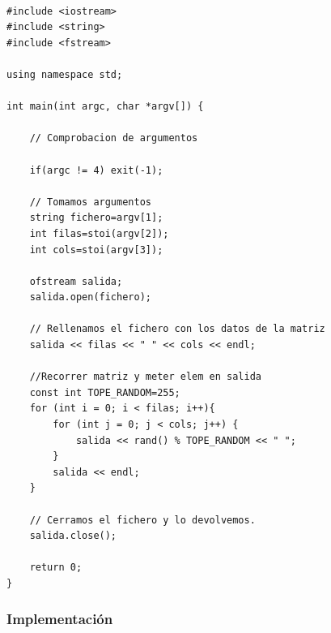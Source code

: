 \documentclass[a4paper,12pt,twoside]{article} %
\begin{document}
\lstset{language=C++}
\begin{lstlisting}

#include <iostream>
#include <string>
#include <fstream>

using namespace std;

int main(int argc, char *argv[]) {

    // Comprobacion de argumentos

    if(argc != 4) exit(-1);

    // Tomamos argumentos
    string fichero=argv[1];
    int filas=stoi(argv[2]);
    int cols=stoi(argv[3]);

    ofstream salida;
    salida.open(fichero);

    // Rellenamos el fichero con los datos de la matriz
    salida << filas << " " << cols << endl;

    //Recorrer matriz y meter elem en salida
    const int TOPE_RANDOM=255;
    for (int i = 0; i < filas; i++){
        for (int j = 0; j < cols; j++) {
            salida << rand() % TOPE_RANDOM << " ";
        }
        salida << endl;
    }

    // Cerramos el fichero y lo devolvemos.
    salida.close();

    return 0;
}

\end{lstlisting}

\newpage


\subsubsection{Implementación}
\end{document}

